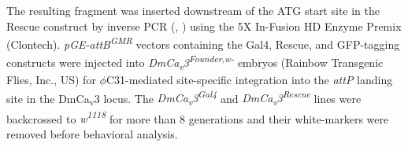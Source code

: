 The resulting fragment was inserted downstream of the ATG start site in the Rescue construct by inverse PCR (, ) using the 5X In-Fusion HD Enzyme Premix (Clontech).       
\emph{pGE-attB\textsuperscript{GMR}} vectors containing the Gal4, Rescue, and GFP-tagging constructs were injected into \emph{DmCa\textsubscript{v}3\textsuperscript{Founder,w-}} embryos (Rainbow Transgenic Flies, Inc., US) for $\phi$C31-mediated site-specific integration into the \emph{attP} landing site in the DmCa\textsubscript{v}3 locus.
The \emph{DmCa\textsubscript{v}3\textsuperscript{Gal4}} and \emph{DmCa\textsubscript{v}3\textsuperscript{Rescue}} lines were backcrossed to \emph{w\textsuperscript{1118}} for more than 8 generations and their white-markers were removed before behavioral analysis.
